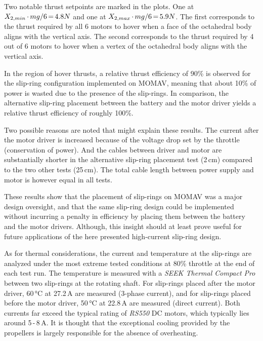 \documentclass[conference]{IEEEtran}
\newcommand{\mcomp}{\thinmuskip=3mu\medmuskip=3mu\thickmuskip=3mu}
\begin{document}
\par
Two notable thrust setpoints are marked in the plots. One at $\mcomp X_{2,min}\cdot mg/6 = 4.8N$ and one at $\mcomp X_{2,max} \cdot mg/6 = 5.9N$. The first corresponds to the thrust required by all 6 motors to hover when a face of the octahedral body aligns with the vertical axis. The second corresponds to the thrust required by 4 out of 6 motors to hover when a vertex of the octahedral body aligns with the vertical axis.
\par
In the region of hover thrusts, a relative thrust efficiency of 90\% is observed for the slip-ring configuration implemented on MOMAV, meaning that about 10\% of power is wasted due to the presence of the slip-rings. In comparison, the alternative slip-ring placement between the battery and the motor driver yields a relative thrust efficiency of roughly 100\%.
\par
Two possible reasons are noted that might explain these results. The current after the motor driver is increased because of the voltage drop set by the throttle (conservation of power). And the cables between driver and motor are substantially shorter in the alternative slip-ring placement test (2\,cm) compared to the two other tests (25\,cm). The total cable length between power supply and motor is however equal in all tests.
\par
These results show that the placement of slip-rings on MOMAV was a major design oversight, and that the same slip-ring design could be implemented without incurring a penalty in efficiency by placing them between the battery and the motor drivers. Although, this insight should at least prove useful for future applications of the here presented high-current slip-ring design.
\par
As for thermal considerations, the current and temperature at the slip-rings are analyzed under the most extreme tested conditions at 80\% throttle at the end of each test run. The temperature is measured with a \textit{SEEK Thermal Compact Pro} between two slip-rings at the rotating shaft. For slip-rings placed after the motor driver, 60\,°C at 27.2\,A are measured (3-phase current), and for slip-rings placed before the motor driver, 50\,°C at 22.8\,A are measured (direct current). Both currents far exceed the typical rating of \textit{RS550} DC motors, which typically lies around 5\,-\,8\,A. It is thought that the exceptional cooling provided by the propellers is largely responsible for the absence of overheating.


\vspace{14pt}
\end{document}
